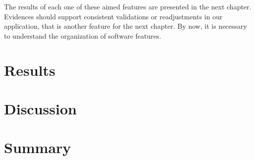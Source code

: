 The results of each one of these aimed features are presented in the next chapter. Evidences should support consistent validations or readjustments in our application, that is another feature for the next chapter. By now, it is necessary to understand the organization of software features. 

\section{Results}

\section{Discussion}

\section{Summary}
